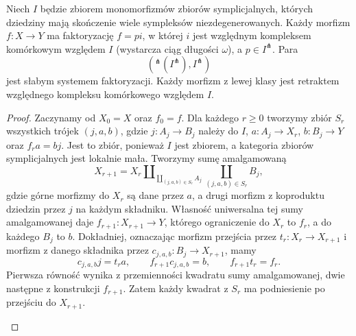 \begin{twierdzenie}\label{cat:thm:small-object-sset}
Niech $I$ będzie zbiorem monomorfizmów zbiorów symplicjalnych, których dziedziny mają skończenie wiele sympleksów niezdegenerowanych. Każdy morfizm $f:X\to Y$ ma faktoryzację $f=pi$, w której $i$ jest względnym kompleksem komórkowym względem $I$ (wystarcza ciąg długości $\omega$), a $p\in I^\pitchfork$. Para
\[
 ({}^\pitchfork(I^\pitchfork),I^\pitchfork)
\]
jest słabym systemem faktoryzacji. Każdy morfizm z lewej klasy jest retraktem względnego kompleksu komórkowego względem $I$.
\end{twierdzenie}
\begin{proof}
Zaczynamy od $X_0=X$ oraz $f_0=f$. Dla każdego $r\geq0$ tworzymy zbiór $S_r$ wszystkich trójek $(j,a,b)$, gdzie $j:A_j\to B_j$ należy do $I$, $a:A_j\to X_r$, $b:B_j\to Y$ oraz $f_ra=bj$. Jest to zbiór, ponieważ $I$ jest zbiorem, a kategoria zbiorów symplicjalnych jest lokalnie mała. Tworzymy sumę amalgamowaną
\[
 X_{r+1}=X_r\amalg_{\coprod_{(j,a,b)\in S_r}A_j}
                       \coprod_{(j,a,b)\in S_r}B_j,
\]
gdzie górne morfizmy do $X_r$ są dane przez $a$, a drugi morfizm z koproduktu dziedzin przez $j$ na każdym składniku. Własność uniwersalna tej sumy amalgamowanej daje $f_{r+1}:X_{r+1}\to Y$, którego ograniczenie do $X_r$ to $f_r$, a do każdego $B_j$ to $b$. Dokładniej, oznaczając morfizm przejścia przez $t_r:X_r\to X_{r+1}$ i morfizm z danego składnika przez $c_{j,a,b}:B_j\to X_{r+1}$, mamy
\[
 c_{j,a,b}j=t_ra,\qquad
 f_{r+1}c_{j,a,b}=b,\qquad f_{r+1}t_r=f_r.
\]
Pierwsza równość wynika z przemienności kwadratu sumy amalgamowanej, dwie następne z konstrukcji $f_{r+1}$. Zatem każdy kwadrat z $S_r$ ma podniesienie po przejściu do $X_{r+1}$.

\begin{center}
\end{center}


\end{proof}
